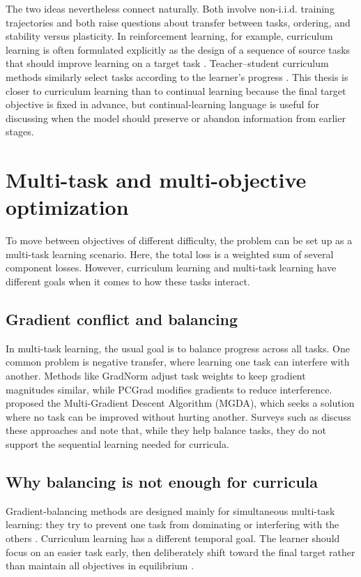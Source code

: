 \documentclass[english,master,a4paper,oneside]{ppfcmthesis}
\begin{document}
The two ideas nevertheless connect naturally. Both involve non-i.i.d. training
trajectories and both raise questions about transfer between tasks, ordering,
and stability versus plasticity. In reinforcement learning, for example,
curriculum learning is often formulated explicitly as the design of a sequence
of source tasks that should improve learning on a target task
\citep{narvekar2020curriculum}. Teacher--student curriculum methods similarly
select tasks according to the learner's progress \citep{matiisen2020teacher}.
This thesis is closer to curriculum learning than to continual learning because
the final target objective is fixed in advance, but continual-learning language
is useful for discussing when the model should preserve or abandon information
from earlier stages.

\section{Multi-task and multi-objective optimization}

To move between objectives of different difficulty, the problem can be set up
as a multi-task learning scenario. Here, the total loss is a weighted sum of
several component losses. However, curriculum learning and multi-task learning
have different goals when it comes to how these tasks interact.

\subsection{Gradient conflict and balancing}
In multi-task learning, the usual goal is to balance progress across all tasks.
One common problem is negative transfer, where learning one task can interfere
with another. Methods like GradNorm \citep{chen2018gradnorm} adjust task weights
to keep gradient magnitudes similar, while PCGrad \citep{yu2020gradient}
modifies gradients to reduce interference. \citet{sener2018multi} proposed the
Multi-Gradient Descent Algorithm (MGDA),
which seeks a solution where no task can be improved without hurting another.
Surveys such as \citet{chen2024gradient} discuss these approaches and note that,
while they help balance tasks, they do not support the sequential learning
needed for curricula.

\subsection{Why balancing is not enough for curricula}
Gradient-balancing methods are designed mainly for simultaneous multi-task
learning: they try to prevent one task from dominating or interfering with the
others \citep{chen2018gradnorm,yu2020gradient,sener2018multi,chen2024gradient}.
Curriculum learning has a different temporal goal. The learner should focus on
an easier task early, then deliberately shift toward the final target rather
than maintain all objectives in equilibrium
\citep{bengio2009curriculum,narvekar2020curriculum,matiisen2020teacher}.
\end{document}
